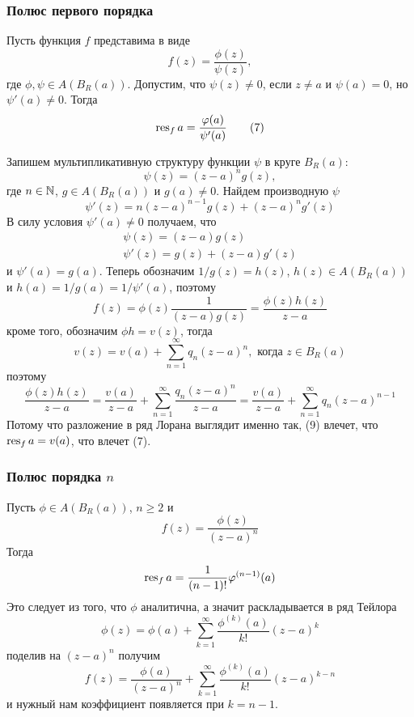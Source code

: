 \documentclass[main]{subfiles}
\begin{document}
\subsubsection{Полюс первого порядка}
Пусть функция $f$ представима в виде
\[f(z) = \frac{\phi(z)}{\psi(z)},\]
где $\phi, \psi \in A(B_R(a))$.
Допустим, что $\psi(z) \neq 0$, если $z \neq a$ и $\psi(a) = 0$, но $\psi'(a) \neq 0$.
Тогда
\[\operatorname{res}_f a = \frac{\varphi(a)}{\psi'(a)} \tag{7}\]
\begin{longProof}
    Запишем мультипликативную структуру функции $\psi$ в круге $B_R(a)$:
    \[\psi(z) = (z - a)^n g(z), \]
    где $n \in \mathbb{N}$, $g \in A(B_R(a))$ и $g(a) \neq 0$.
    Найдем производную $\psi$
    \[\psi' (z) = n (z-a)^{n-1} g(z) + (z-a)^n g'(z)\]
    В силу условия $\psi'(a) \neq 0$ получаем, что
    \begin{gather*}
        \psi(z) = (z - a) g(z)\\
        \psi' (z) =  g(z) + (z-a) g'(z)
    \end{gather*}
    и $\psi'(a) = g(a)$.
    Теперь обозначим $1/g(z) = h(z)$, $h(z) \in A(B_R(a))$ и $h(a) = 1/g(a) = 1/\psi'(a)$, поэтому
    \[f(z) = \phi(z) \frac{1}{(z-a) g(z)} = \frac{\phi(z) h(z)}{z-a}\]
    кроме того, обозначим $\phi h = v(z)$, тогда
    \[v(z) = v(a) + \sum_{n=1}^{\infty} q_n (z-a)^n, \text{ когда } z \in B_R(a) \tag{8}\]
    поэтому
    \[\frac{\phi(z) h(z)}{z-a} = \frac{v(a)}{z-a} + \sum_{n=1}^{\infty} \frac{q_n (z-a)^n}{z-a} = \frac{v(a)}{z-a} + \sum_{n=1}^{\infty} q_n (z-a)^{n-1} \tag{9}\]
    Потому что разложение в ряд Лорана выглядит именно так, (9) влечет, что $\operatorname{res}_f a = v(a)$, что влечет (7).
\end{longProof}

\subsubsection{Полюс порядка $n$}
Пусть $\phi \in A(B_R(a))$, $n \ge 2$ и
\[f(z) = \frac{\phi(z)}{(z-a)^n}\]
Тогда
\[\operatorname{res}_f a = \frac{1}{(n-1)!} \varphi^{(n-1)}(a)\]
Это следует из того, что $\phi$ аналитична, а значит раскладывается в ряд Тейлора
\[\phi(z) = \phi(a) + \sum_{k=1}^{\infty} \frac{\phi^{(k)}(a)}{k!}(z-a)^k\]
поделив на $(z-a)^n$ получим
\[f(z) = \frac{\phi(a)}{(z-a)^n} + \sum_{k=1}^{\infty} \frac{\phi^{(k)}(a)}{k!}(z-a)^{k-n} \]
и нужный нам коэффициент появляется при $k = n-1$.
\end{document}
